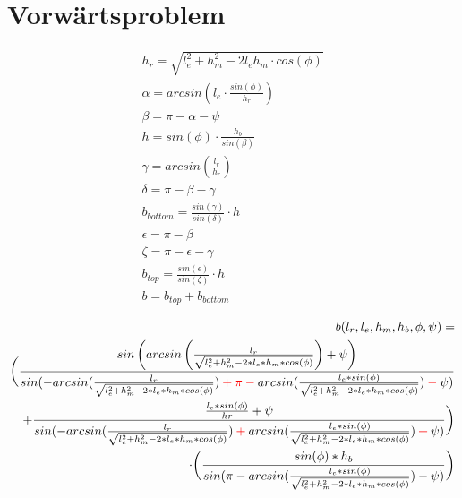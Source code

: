 \documentclass[12pt,a4paper]{article}
\author{Vera Loeser}
\begin{document}
	\section{Vorw\"artsproblem}

\begin{align*}
h_r = \sqrt{l_e^2 + h_m^2 - 2l_eh_m\cdot cos(\phi)}\\
\alpha =arcsin\left(l_e \cdot \frac{sin(\phi)}{h_r}\right)\\
\beta = \pi - \alpha - \psi\\
h = sin(\phi) \cdot \frac{h_b}{sin(\beta)}\\
\gamma = arcsin(\frac{l_r}{h_r})\\
\delta = \pi - \beta - \gamma\\
b_{bottom} = \frac{sin(\gamma)}{sin(\delta)}\cdot h\\
\epsilon = \pi - \beta\\
\zeta = \pi - \epsilon - \gamma\\
b_{top} = \frac{sin(\epsilon)}{sin(\zeta)}\cdot h\\
b = b_{top} + b_{bottom}
\end{align*}

\begin{align*}
\begin{split}
b (l_r, l_e, h_m, h_b, \phi, \psi) =\\ \bigg(\frac{sin\left(arcsin\left(\frac{l_r}{\sqrt{l_e ^2 + h_m^2 - 2*l_e*h_m * cos(\phi)}}\right)+\psi\right) }{sin(-arcsin(\frac{l_r}{\sqrt{l_e ^2 + h_m^2 - 2*l_e*h_m * cos(\phi)}})\color{red} + \pi - \color{black} arcsin(\frac{l_e * sin(\phi)}{\sqrt{l_e ^2 + h_m^2 - 2*l_e*h_m * cos(\phi)}}) \color{red} - \color{black} \psi)}\\ 
+ \frac{\frac{l_e*sin(\phi)}{hr}+\psi}{sin(-arcsin(\frac{l_r}{\sqrt{l_e ^2 + h_m^2 - 2*l_e*h_m * cos(\phi)}}) \color{red}+\color{black} arcsin(\frac{l_e * sin(\phi)}{\sqrt{l_e ^2 + h_m^2 - 2*l_e*h_m * cos(\phi)}}) \color{red} + \color{black} \psi)}\bigg)\\
\cdot\bigg(\frac{sin(\phi) * h_b}{sin(\pi - arcsin(\frac{l_e * sin(\phi)}{\sqrt{l_e ^2 + h_m^2 - 2*l_e*h_m * cos(\phi)}}) - \psi)}\bigg)
\end{split}
\end{align*}
\end{document}
